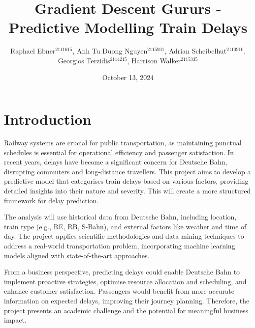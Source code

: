 \documentclass[a4paper,oneside,bibliography=totoc]{scrartcl}
\begin{document}
\frontmatter \subject{Data Mining Project Outline HWS24} %
\title{Gradient Descent Gururs - Predictive Modelling Train Delays}
\author{Raphael Ebner$^{2111615}$, Anh Tu Duong Nguyen$^{2115931}$, Adrian Scheibelhut$^{2110910}$,\\ Georgios Terzidis$^{2114215}$, Harrison Walker$^{2115335}$} \date{October 13, 2024}
\publishers{{\small Submitted to}\\
Data and Web Science Group\\
Prof.\ Dr.\ Hertling\\
University of Mannheim\\}

\maketitle


\mainmatter
\pagebreak
\section{Introduction}
\label{sec:intro}

Railway systems are crucial for public transportation,
as maintaining punctual schedules is essential for operational efficiency and passenger satisfaction.
In recent years, delays have become a significant concern for Deutsche Bahn,
disrupting commuters and long-distance travellers.
This project aims to develop a predictive model that categorises train delays based on various factors,
providing detailed insights into their nature and severity.
This will create a more structured framework for delay prediction.

The analysis will use historical data from Deutsche Bahn, including location,
train type (e.g., RE, RB, S-Bahn), and external factors like weather and time of day.
The project applies scientific methodologies and data mining techniques to address a real-world transportation problem,
incorporating machine learning models aligned with state-of-the-art approaches.

From a business perspective, predicting delays could enable Deutsche Bahn to implement proactive strategies,
optimise resource allocation and scheduling,
and enhance customer satisfaction.
Passengers would benefit from more accurate information on expected delays, improving their journey planning.
Therefore, the project presents an academic challenge and the potential for meaningful business impact.
\end{document}
